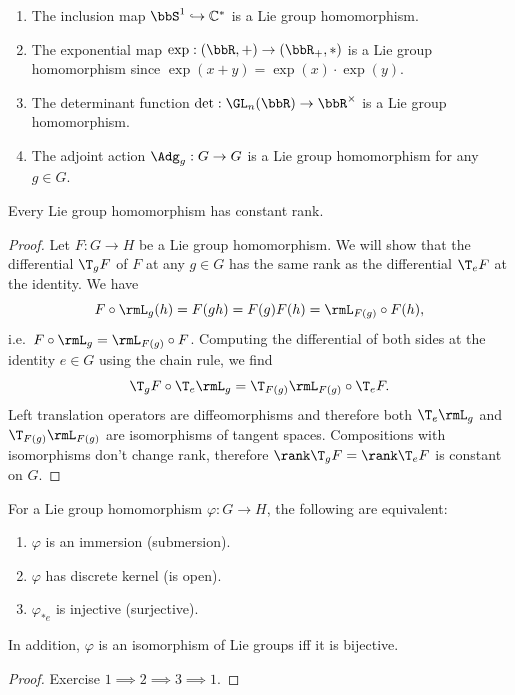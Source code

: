 \begin{example}
    \begin{enumerate}[label=(\alph*)]
        \item The inclusion map $\bbS^1\hookrightarrow \mathbb{C}^\ast$ is a Lie group homomorphism.
        \item The exponential map $\exp:(\bbR ,+)\to (\bbR_+,*)$ is a Lie group homomorphism since $\exp(x+y)=\exp(x)\cdot \exp(y)$.
        \item The determinant function $\det:\GL_n(\bbR )\to \bbR^\times$ is a Lie group homomorphism.
        \item The adjoint action $\Adg_g:G\to G$ is a Lie group homomorphism for any $g\in G$.
    \end{enumerate}
\end{example}

\begin{thm}
    Every Lie group homomorphism has constant rank.
\end{thm}
\begin{proof}
    Let $F:G\to H$ be a Lie group homomorphism. We will show that the differential $\T_g F$ of $F$ at any $g\in G$ has the same rank as the differential $\T_eF$ at the identity. We have
    \[F\circ \rmL_g (h)=F(gh)=F(g)F(h)=\rmL_{F(g)}\circ F(h),\]
    i.e.~$F\circ \rmL_g=\rmL_{F(g)}\circ F$. Computing the differential of both sides at the identity $e\in G$ using the chain rule, we find
    \[\T_gF\circ \T_e \rmL_g=\T_{F(g)}\rmL_{F(g)}\circ \T_e F.\]
    Left translation operators are diffeomorphisms and therefore both $\T_e \rmL_g$ and $\T_{F(g)}\rmL_{F(g)}$ are isomorphisms of tangent spaces. Compositions with isomorphisms don't change rank, therefore $\rank \T_gF=\rank \T_e F$ is constant on $G$.
\end{proof}
\begin{cor}[{{\cite[Cor.~5.3.7]{RS1}}}]\label{cor 5.3.7 RS1}
    For a Lie group homomorphism $\varphi:G\to H$, the following are equivalent:
    \begin{enumerate}
        \item $\varphi$ is an immersion (submersion).
        \item $\varphi$ has discrete kernel (is open).
        \item $\varphi_{\ast e}$ is injective (surjective).
    \end{enumerate}
    In addition, $\varphi$ is an isomorphism of Lie groups iff it is bijective.
\end{cor}
\begin{proof}
    Exercise $1\implies 2\implies 3 \implies 1$.
\end{proof}

